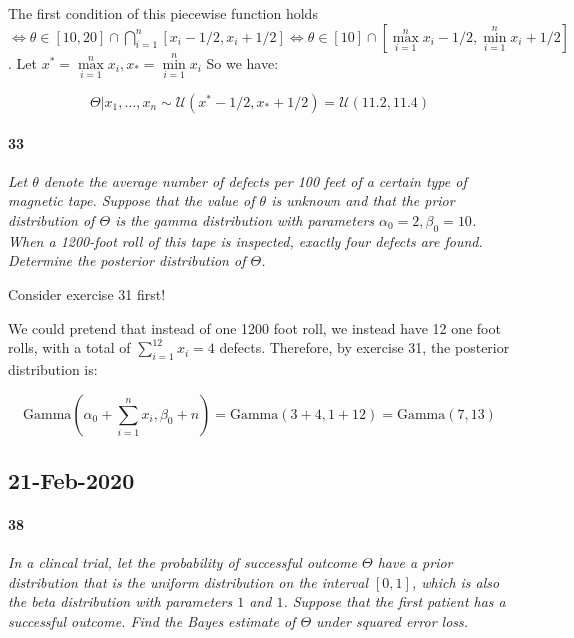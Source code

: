 \documentclass[a4paper]{article}
\begin{document}
                The first condition of this piecewise function holds $\iff
                \theta \in [10, 20] \cap \bigcap\limits_{i=1}^n [x_i - 1/2, x_i
                + 1/2] \iff \theta \in [10] \cap [\max\limits_{i=1}^n x_i - 1/2,
                \min\limits_{i=1}^n x_i + 1/2]$. Let $x^* = \max\limits_{i=1}^n
                x_i, x_* = \min\limits_{i = 1}^n x_i$ So we have:

                \[
                    \Theta | x_1, ..., x_n \sim \mathcal{U}(x^* - 1/2, x_* +
                    1/2) = \mathcal{U}(11.2, 11.4)
                \]

            \paragraph{33}
            \textit{Let $\theta$ denote the average number of defects per 100
            feet of a certain type of magnetic tape. Suppose that the value of
            $\theta$ is unknown and that the prior distribution of $\Theta$ is
            the gamma distribution with parameters $\alpha_0 = 2, \beta_0 = 10$.
            When a 1200-foot roll of this tape is inspected, exactly four
            defects are found. Determine the posterior distribution of
            $\Theta$.}
                \begin{relq}
                    Consider exercise 31 first!
                \end{relq}

                We could pretend that instead of one 1200 foot roll, we instead
                have 12 one foot rolls, with a total of $\sum\limits_{i=1}^{12}
                x_i = 4$ defects. Therefore, by exercise 31, the posterior
                distribution is:

                \[
                    \text{Gamma}\left(\alpha_0 + \sum\limits_{i=1}^{n} x_i,
                    \beta_0 + n\right) = \text{Gamma}(3 + 4, 1 + 12) =
                    \text{Gamma}(7, 13)
                \]

        \subsection*{21-Feb-2020}
            \paragraph{38}
            \textit{In a clincal trial, let the probability of successful
            outcome $\Theta$ have a prior distribution that is the uniform
            distribution on the interval $[0, 1]$, which is also the beta
            distribution with parameters $1$ and $1$. Suppose that the first
            patient has a successful outcome. Find the Bayes estimate of
            $\Theta$ under squared error loss.}
\end{document}
